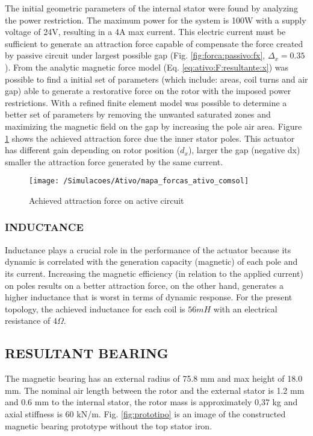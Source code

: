 \documentclass[10pt,fleqn,a4paper,twoside]{article}
\begin{document}
	The initial geometric parameters of the internal stator were found by analyzing the power restriction. The maximum power for the system is 100W with a  supply voltage of 24V, resulting in a 4A max current. This electric current must be sufficient to generate an attraction force capable of compensate the force created by passive circuit under largest possible gap (Fig. \ref{fig:forca:passivo:fx}, $\Delta_x = 0.35$). From the analytic magnetic force model (Eq. \eqref{eq:ativo:F:resultante:x}) was possible to find a initial set of parameters (which include: areas, coil turns and air gap) able to generate a restorative force on the rotor with the imposed power restrictions. With a refined finite element model was possible to determine a better set of parameters by removing the unwanted saturated zones and maximizing the magnetic field on the gap by increasing the pole air area. Figure \ref{fig:forca:ativo} shows the achieved attraction force due the inner stator poles. This actuator has different gain depending on rotor position ($d_x$), larger the gap (negative dx) smaller the attraction force generated by the same current.
	
	\begin{figure}[ht]
	\centering
	\texttt{[image: /Simulacoes/Ativo/mapa\_forcas\_ativo\_comsol]}
	\caption{Achieved attraction force on active circuit}
	\label{fig:forca:ativo}
	\end{figure}		
		
	\subsubsection{\uppercase{Inductance}} \label{subsec:at:indutancia}
	
	Inductance plays a crucial role in the performance of the actuator because its dynamic is correlated with the generation capacity (magnetic) of each pole and its current. Increasing the magnetic efficiency (in relation to the applied current) on poles results on a better attraction force, on the other hand,  generates a higher inductance that is worst in terms of dynamic response. For the present topology, the achieved inductance for each coil is $56 mH$ with an electrical resistance of $4 \Omega$. 
		
	\subsection{\uppercase{Resultant bearing}}
	
	The magnetic bearing has an external radius of 75.8 mm and max height of 18.0 mm. The nominal air length between the rotor and the external stator is 1.2 mm and 0.6 mm to the internal stator, the rotor mass is approximately 0,37 kg and axial stiffness is 60 kN/m. Fig. \ref{fig:prototipo} is an image of the constructed magnetic bearing prototype without the top stator iron.
	 
\end{document}
